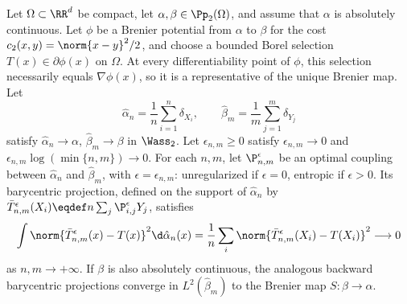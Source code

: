 \begin{prop}\label{prop-empirical-barycentric-map-consistency}
	Let \(\Omega\subset\RR^d\) be compact, let \(\alpha,\beta\in\Pp_2(\Omega)\), and assume that \(\alpha\) is absolutely continuous. Let \(\phi\) be a Brenier potential from \(\alpha\) to \(\beta\) for the cost \(c_2(x,y)=\norm{x-y}^2/2\), and choose a bounded Borel selection \(T(x)\in\partial\phi(x)\) on \(\Omega\). At every differentiability point of \(\phi\), this selection necessarily equals \(\nabla\phi(x)\), so it is a representative of the unique Brenier map. Let
	\[
		\hat\alpha_n=\frac1n\sum_{i=1}^n\delta_{X_i},
		\qquad
		\hat\beta_m=\frac1m\sum_{j=1}^m\delta_{Y_j}
	\]
	satisfy \(\hat\alpha_n\to\alpha\), \(\hat\beta_m\to\beta\) in \(\Wass_2\). Let \(\epsilon_{n,m}\geq0\) satisfy \(\epsilon_{n,m}\to0\) and \(\epsilon_{n,m}\log(\min\{n,m\})\to0\). For each \(n,m\), let \(\P_{n,m}^{\epsilon}\) be an optimal coupling between \(\hat\alpha_n\) and \(\hat\beta_m\), with \(\epsilon=\epsilon_{n,m}\): unregularized if \(\epsilon=0\), entropic if \(\epsilon>0\). Its barycentric projection, defined on the support of \(\hat\alpha_n\) by
	$\bar T_{n,m}^{\epsilon}(X_i) \eqdef n\sum_j \P_{i,j}^{\epsilon}Y_j$,
	satisfies
	\[
		\int \norm{\bar T_{n,m}^{\epsilon}(x)-T(x)}^2
		\d\hat\alpha_n(x)
		=
		\frac1n\sum_i \norm{\bar T_{n,m}^{\epsilon}(X_i)-T(X_i)}^2
		\longrightarrow0
	\]
	as \(n,m\to+\infty\).
	If \(\beta\) is also absolutely continuous, the analogous backward barycentric projections converge in \(L^2(\hat\beta_m)\) to the Brenier map \(S:\beta\to\alpha\).
\end{prop}

